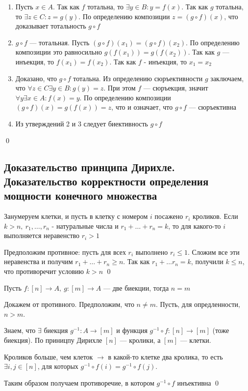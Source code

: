 \documentclass[a4paper]{article}
\begin{document}
\proof 
\begin{enumerate}
    \item Пусть $x\in A$. Так как $f$ тотальна, то $\exists y\in B: y=f(x)$. Так как $g$ тотальна, то $\exists z\in C: z=g(y)$. По определению композиции $z=(g\circ f)(x)$, что доказывает тотальность $g\circ f$
    \item $g\circ f$ — тотальная. Пусть $(g\circ f)(x_1)=(g\circ f)(x_2)$. По определению композиции это равносильно $g(f(x_1))=g(f(x_2))$. Так как $g$ — инъекция, то $f(x_1)=f(x_2)$. Так как $f$ - инъекция, то $x_1=x_2$
    \item Доказано, что $g\circ f$ тотальна. Из определению сюръективности $g$ заключаем, что $\forall z\in C\exists y\in B: g(y)=z$. При этом $f$ — сюръекция, значит $\forall y\exists x\in A: f(x)=y$. По определению композиции $(g\circ f)(x)=g(f(x))=z$, что и означает, что $g\circ f$ — сюръективна
    \item Из утверждений 2 и 3 следует биективность $g\circ f$
\end{enumerate}\qed


\subsection{Доказательство принципа Дирихле. Доказательство корректности определения мощности конечного множества}
\theorem Занумеруем клетки, и пусть в клетку с номером $i$ посажено $r_i$ кроликов. Если $k>n,\ r_1,\ldots,r_n$ - натуральные числа и $r_1+\ldots+r_n=k$, то для какого-то $i$ выполняется неравенство $r_i>1$

\proof Предположим противное: пусть для всех $r_i$ выполнено $r_i\leqslant1$. Сложим все эти неравенства и получим $r_1+\ldots+r_n\geqslant n$. Так как $r_1+\ldots r_n=k$, получили $k\leqslant n$, что противоречит условию $k>n$ \qed

\theorem Пусть $f: [n]\rightarrow A,\ g: [m]\rightarrow A$ — две биекции, тогда $n=m$

\proof Докажем от противного. Предположим, что $n\ne m$. Пусть, для опредленности, $n>m$. 

Знаем, что $\exists$ биекция $g^{-1}: A\rightarrow [m]$ и функция $g^{-1}\circ f: [n]\rightarrow[m]$ (тоже биекция). По приницпу Дирихле $[n]$ — кролики, а $[m]$ — клетки. 

Кроликов больше, чем клеток $\rightarrow$ в какой-то клетке два кролика, то есть $\exists i,j\in[n]$, для которых $g^{-1}\circ f(i)=g^{-1}\circ f(j)$. 

Таким образом получаем противоречие, в котором $g^{-1}\circ f$ инъективна \qed
\end{document}
